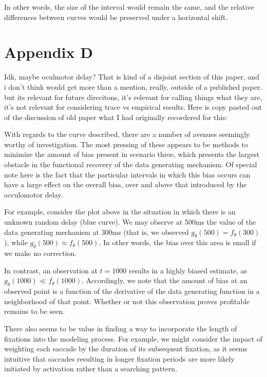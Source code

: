 \documentclass{article}
\begin{document}
In other words, the size of the interval would remain the same, and the relative differences between curves would be preserved under a horizontal shift. 

\section*{Appendix D}

Idk, maybe oculmotor delay? That is kind of a disjoint section of this paper, and i don't think would get more than a mention, really, outside of a published paper. but its relevant for future direcitons, it's relevant for calling things what they are, it's not relevant for considering trace vs empirical results. Here is copy pasted out of the discussion of old paper what I had originally recordered for this:

With regards to the curve described, there are a number of avenues seemingly worthy of investigation. The most pressing of these appears to be methods to minimize the amount of bias present in scenario three, which presents the largest obstacle in the functional recovery of the data generating mechanism. Of special note here is the fact that the particular intervals in which this bias occurs can have a large effect on the overall bias, over and above that introduced by the occulomotor delay. 

For example, consider the plot above in the situation in which there is an unknown random delay (blue curve). We may observe at 500ms the value of the data generating mechanism at 300ms (that is, we observed $g_{\theta}(500) = f_{\theta}(300)$), while $g_{\theta}(500) \approx f_{\theta}(500)$. In other words, the bias over this area is small if we make no correction.

In contrast, an observation at $t = 1000$ results in a highly biased estimate, as $g_{\theta}(1000) \ll f_{\theta}(1000)$. Accordingly, we note that the amount of bias at an observed point is a function of the derivative of the data generating function in a neighborhood of that point. Whether or not this observation proves profitable remains to be seen.

There also seems to be value in finding a way to incorporate the length of fixations into the modeling process. For example, we might consider the impact of weighting each saccade by the duration of its subsequent fixation, as it seems intuitive that saccades resulting in longer fixation periods are more likely initiated by activation rather than a searching pattern.
\end{document}
